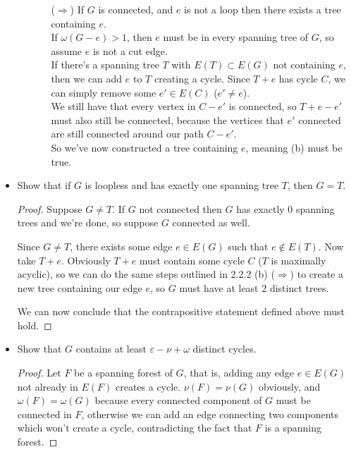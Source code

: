\documentclass[11pt]{article}
\newcommand\itm[1]{\item[\textbf{#1}]}
\newcommand{\n}{\vspace{0.3cm}}
\begin{document}
\begin{itemize}
\begin{enumerate}[label=(\alph*)]
\begin{enumerate}
            \item[(\(\Rightarrow\))] If \(G\) is connected, and \(e\) is not a loop then there exists a tree containing \(e\). \n\\
              If \(\omega(G - e) > 1\), then \(e\) must be in every spanning tree of \(G\), so assume \(e\) is not a cut edge.\n\\
              If there's a spanning tree \(T\) with \(E(T) \subset E(G)\) not containing \(e\), then we can add \(e\) to \(T\) creating a cycle.  Since \(T + e\) has cycle \(C\), we can simply remove some \(e' \in E(C)\) (\(e' \neq e\)). \n\\
              We still have that every vertex in \(C-e'\) is connected, so \(T + e - e'\) must also still be connected, because the vertices that \(e'\) connected are still connected around our path \(C-e'\). \n\\
              So we've now constructed a tree containing \(e\), meaning (b) must be true. \n
          \end{enumerate}
    \end{enumerate}



  \itm{2.2.3} Show that if \(G\) is loopless and has exactly one spanning tree \(T\), then \(G = T\).
    \begin{proof}
      Suppose \(G \neq T\).  If \(G\) not connected then \(G\) has exactly 0 spanning trees and we're done, so suppose \(G\) connected as well.

      Since \(G \neq T\), there exists some edge \(e \in E(G)\) such that \(e \not\in E(T)\).  Now take \(T+e\).  Obviously \(T+e\) must contain some cycle \(C\) (\(T\) is maximally acyclic), so we can do the same steps outlined in 2.2.2 (b) (\(\Rightarrow\)) to create a new tree containing our edge \(e\), so \(G\) must have at least 2 distinct trees.

      We can now conclude that the contrapositive statement defined above must hold.
    \end{proof}
  



  \itm{2.2.5} Show that \(G\) contains at least \(\varepsilon - \nu + \omega\) distinct cycles.
    \begin{proof}
      Let \(F\) be a spanning forest of \(G\), that is, adding any edge \(e \in E(G)\) not already in \(E(F)\) creates a cycle.  \(\nu(F) = \nu(G)\) obviously, and \(\omega(F) = \omega(G)\) because every connected component of \(G\) must be connected in \(F\), otherwise we can add an edge connecting two components which won't create a cycle, contradicting the fact that \(F\) is a spanning forest.


\end{proof}
\end{itemize}
\end{document}
